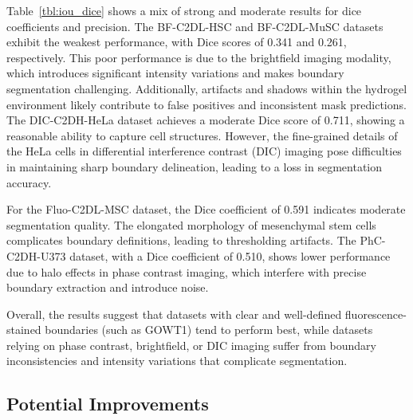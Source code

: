 \documentclass[./dissertation.tex]{subfiles}
\begin{document}
Table~\ref{tbl:iou_dice} shows a mix of strong and moderate results for dice coefficients and precision. The BF-C2DL-HSC and BF-C2DL-MuSC datasets exhibit the weakest performance, with Dice scores of 0.341 and 0.261, respectively. This poor performance is due to the brightfield imaging modality, which introduces significant intensity variations and makes boundary segmentation challenging. Additionally, artifacts and shadows within the hydrogel environment likely contribute to false positives and inconsistent mask predictions. The DIC-C2DH-HeLa dataset achieves a moderate Dice score of 0.711, showing a reasonable ability to capture cell structures. However, the fine-grained details of the HeLa cells in differential interference contrast (DIC) imaging pose difficulties in maintaining sharp boundary delineation, leading to a loss in segmentation accuracy.

For the Fluo-C2DL-MSC dataset, the Dice coefficient of 0.591 indicates moderate segmentation quality. The elongated morphology of mesenchymal stem cells complicates boundary definitions, leading to thresholding artifacts. The PhC-C2DH-U373 dataset, with a Dice coefficient of 0.510, shows lower performance due to halo effects in phase contrast imaging, which interfere with precise boundary extraction and introduce noise.

Overall, the results suggest that datasets with clear and well-defined fluorescence-stained boundaries (such as GOWT1) tend to perform best, while datasets relying on phase contrast, brightfield, or DIC imaging suffer from boundary inconsistencies and intensity variations that complicate segmentation.


\subsection{Potential Improvements}
\end{document}
